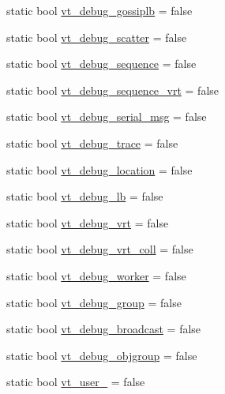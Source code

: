 \begin{DoxyCompactItemize}
\item 
static bool \hyperlink{structvt_1_1arguments_1_1_arg_config_ad7a74adc5ab27891aee08a53e0bade6a}{vt\+\_\+debug\+\_\+gossiplb} = false
\item 
static bool \hyperlink{structvt_1_1arguments_1_1_arg_config_a7f07188c6e8a456e9bfdad9ced6159df}{vt\+\_\+debug\+\_\+scatter} = false
\item 
static bool \hyperlink{structvt_1_1arguments_1_1_arg_config_a871a494f26456713e0e3a2d66d9ed08d}{vt\+\_\+debug\+\_\+sequence} = false
\item 
static bool \hyperlink{structvt_1_1arguments_1_1_arg_config_a8d2ad7c39aea97ec9679b3b660d8c017}{vt\+\_\+debug\+\_\+sequence\+\_\+vrt} = false
\item 
static bool \hyperlink{structvt_1_1arguments_1_1_arg_config_a8823380fec70a43d1179bcbbef969b1f}{vt\+\_\+debug\+\_\+serial\+\_\+msg} = false
\item 
static bool \hyperlink{structvt_1_1arguments_1_1_arg_config_a526c1e1f5819dd2296fed29673a14fbe}{vt\+\_\+debug\+\_\+trace} = false
\item 
static bool \hyperlink{structvt_1_1arguments_1_1_arg_config_a6aba4c0733b232a7bc1889e063185d75}{vt\+\_\+debug\+\_\+location} = false
\item 
static bool \hyperlink{structvt_1_1arguments_1_1_arg_config_a855ec23d7e91d2d7b6dc102c0e9f4b7a}{vt\+\_\+debug\+\_\+lb} = false
\item 
static bool \hyperlink{structvt_1_1arguments_1_1_arg_config_aa50afb2441de7797225ec882ae42ab73}{vt\+\_\+debug\+\_\+vrt} = false
\item 
static bool \hyperlink{structvt_1_1arguments_1_1_arg_config_ad5a4ae4f09e2cb77100e5622e2d5e690}{vt\+\_\+debug\+\_\+vrt\+\_\+coll} = false
\item 
static bool \hyperlink{structvt_1_1arguments_1_1_arg_config_a6386b3a1d890ff781a16546aefb6d642}{vt\+\_\+debug\+\_\+worker} = false
\item 
static bool \hyperlink{structvt_1_1arguments_1_1_arg_config_a858d2cf937f28c93c34d70ef30365664}{vt\+\_\+debug\+\_\+group} = false
\item 
static bool \hyperlink{structvt_1_1arguments_1_1_arg_config_a95bc48ba7cbf5bc30298d47633a15ea5}{vt\+\_\+debug\+\_\+broadcast} = false
\item 
static bool \hyperlink{structvt_1_1arguments_1_1_arg_config_aec0f3598cdf4a78b578a7ac8eaf6f0fc}{vt\+\_\+debug\+\_\+objgroup} = false
\item 
static bool \hyperlink{structvt_1_1arguments_1_1_arg_config_ad4e433d0d0a5e9cbe39a1045194fff3b}{vt\+\_\+user\+\_} = false

\end{DoxyCompactItemize}
